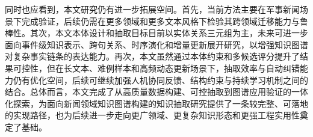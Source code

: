 \begin{conclusion}
同时也应看到，本文研究仍有进一步拓展空间。首先，当前方法主要在军事新闻场景下完成验证，后续仍需在更多领域和更多文本风格下检验其跨领域迁移能力与鲁棒性。其次，本文本体设计和抽取目标目前以实体关系三元组为主，未来可进一步面向事件级知识表示、跨句关系、时序演化和增量更新展开研究，以增强知识图谱对复杂事实链条的表达能力。再次，本文虽然通过本体约束和多候选评分提升了结果可控性，但在长文本、难例样本和高频动态更新场景下，抽取效率与自动纠错能力仍有优化空间，后续可继续加强人机协同反馈、结构约束与持续学习机制之间的结合。总体而言，本文完成了从高质量数据构建、可控抽取到图谱应用验证的一体化探索，为面向新闻领域知识图谱构建的知识抽取研究提供了一条较完整、可落地的实现路径，也为后续进一步走向更广领域、更复杂知识形态和更强工程实用性奠定了基础。

\end{conclusion}
